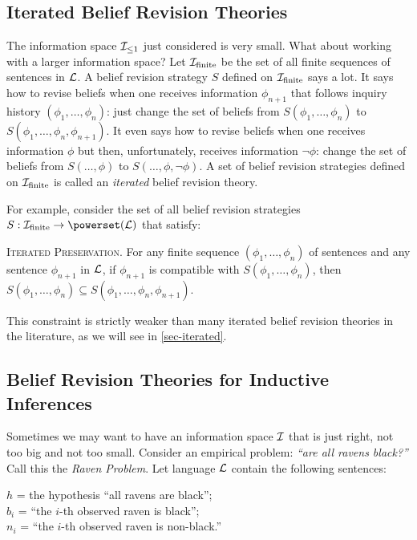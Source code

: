 \subsection{Iterated Belief Revision Theories}

The information space ${\cal I}_{\leq 1}$ just considered is very small. What about working with a larger information space? Let ${\cal I}_{\textrm{finite}}$ be the set of all finite sequences of sentences in ${\cal L}$. A belief revision strategy $S$ defined on ${\cal I}_{\textrm{finite}}$ says a lot. It says how to revise beliefs when one receives information $\phi_{n+1}$ that follows inquiry history $(\phi_1, \ldots, \phi_{n})$: just change the set of beliefs from $S(\phi_1, \ldots, \phi_{n})$ to $S(\phi_1, \ldots, \phi_{n}, \phi_{n+1})$. It even says how to revise beliefs when one receives information $\phi$ but then, unfortunately, receives information $\neg\phi$: change the set of beliefs from $S(\ldots, \phi)$ to $S(\ldots, \phi, \neg\phi)$. A set of belief revision strategies defined on ${\cal I}_{\textrm{finite}}$ is called an {\em iterated} belief revision theory. 

For example, consider the set of all belief revision strategies $S: {\cal I}_{\textrm{finite}} \to \powerset({\cal L)}$ that satisfy: \op

	\xm \textsc{Iterated Preservation.} For any finite sequence $(\phi_1, \ldots, \phi_{n})$ of sentences and any sentence $\phi_{n+1}$ in ${\cal L}$, if $\phi_{n+1}$ is compatible with $S(\phi_1, \ldots, \phi_{n})$, then $S(\phi_1, \ldots, \phi_{n}) \subseteq S(\phi_1, \ldots, \phi_{n}, \phi_{n+1})$.

\ed This constraint is strictly weaker than many iterated belief revision theories in the literature, as we will see in \autoref{sec-iterated}.




\subsection{Belief Revision Theories for Inductive Inferences}\label{sec-raven}
 
Sometimes we may want to have an information space $\cal I$ that is just right, not too big and not too small. Consider an empirical problem: {\em ``are all ravens black?''} Call this the {\em Raven Problem}. Let language ${\cal L}$ contain the following sentences: \op

		\xm $h$ = the hypothesis ``all ravens are black''; 
		\\ $b_{i}$ = ``the $i$-th observed raven is black'';
		\\ $n_{i}$ = ``the $i$-th observed raven is non-black.''

